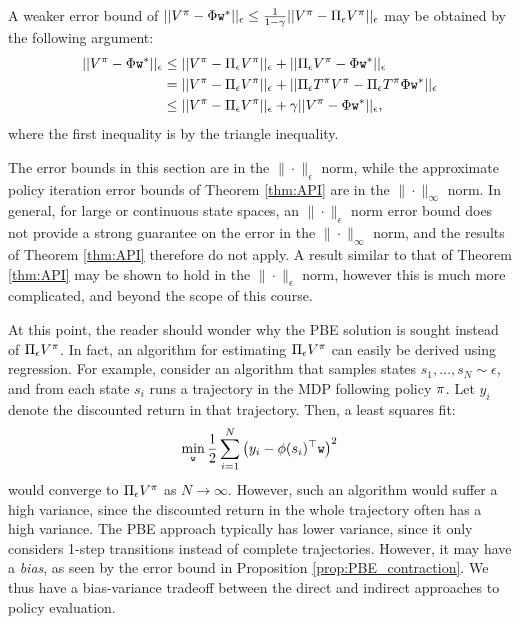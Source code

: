 \begin{remark}
A weaker error bound of $||V^\pi - \Phi \texttt{w}^*||_\epsilon \le \frac{1}{1-\gamma}||V^\pi-\Pi_\epsilon
V^\pi||_\epsilon$ may be obtained by the following argument:
\begin{equation}
\begin{split}
  ||V^\pi - \Phi \texttt{w}^*||_\epsilon  &\leq ||V^\pi
-\Pi_\epsilon V^\pi||_\epsilon + ||\Pi_\epsilon V^\pi -\Phi \texttt{w}^*||_\epsilon  \\
    &= ||V^\pi -\Pi_\epsilon V^\pi||_\epsilon + ||\Pi_\epsilon T^\pi V^\pi -\Pi_\epsilon T^\pi\Phi \texttt{w}^*||_\epsilon \\
&\leq ||V^\pi -\Pi_\epsilon V^\pi||_\epsilon + \gamma||V^\pi-\Phi \texttt{w}^*||_\epsilon,
\end{split}
\end{equation}
where the first inequality is by the triangle inequality.
\end{remark}
\begin{remark}
The error bounds in this section are in the $\| \cdot \|_\epsilon$ norm, while the approximate policy iteration error bounds of Theorem \ref{thm:API} are in the $\| \cdot \|_\infty$ norm. In general, for large or continuous state spaces, an $\| \cdot \|_\epsilon$ norm error bound does not provide a strong guarantee on the error in the $\| \cdot \|_\infty$ norm, and the results of Theorem \ref{thm:API} therefore do not apply. A result similar to that of Theorem \ref{thm:API} may be shown to hold in the $\| \cdot \|_\epsilon$ norm, however this is much more complicated, and beyond the scope of this course.
\end{remark}
\begin{remark}
At this point, the reader should wonder why the PBE solution is sought instead of $\Pi_\epsilon V^\pi$. In fact, an algorithm for estimating $\Pi_\epsilon V^\pi$ can easily be derived using regression. For example, consider an algorithm that samples states $s_1,\dots,s_N \sim \epsilon$, and from each state $s_i$ runs a trajectory in the MDP following policy $\pi$. Let $y_i$ denote the discounted return in that trajectory. Then, a least squares fit:
\begin{equation*}
    \min_{\texttt{w}} \frac{1}{2}\sum_{i=1}^{N} \left(y_i - \phi(s_i)^\top\texttt{w}\right)^2
\end{equation*}
would converge to $\Pi_\epsilon V^\pi$ as $N\to \infty$. However, such an algorithm would suffer a high variance, since the discounted return in the whole trajectory often has a high variance. The PBE approach typically has lower variance, since it only considers 1-step transitions instead of complete trajectories. However, it may have a \emph{bias}, as seen by the error bound in Proposition \ref{prop:PBE_contraction}. We thus have a bias-variance tradeoff between the direct and indirect approaches to policy evaluation.
\end{remark}
